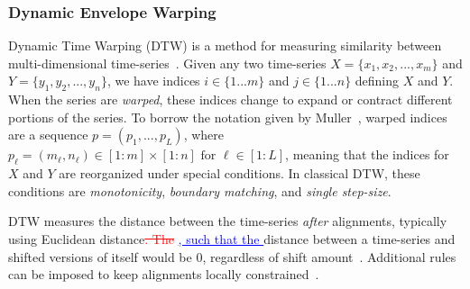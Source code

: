 \documentclass[lettersize,journal]{IEEEtran}
\makeatletter
\renewcommand{\DIFadd}[1]{\textcolor{blue}{\uline{#1}}}
\renewcommand{\DIFdel}[1]{\textcolor{red}{\sout{#1}}}
\providecommand{\DIFadd}[1]{{\protect\color{blue}\uwave{#1}}} %
\providecommand{\DIFdel}[1]{{\protect\color{red}\sout{#1}}} %
\providecommand{\DIFaddbegin}{} %
\providecommand{\DIFaddend}{} %
\providecommand{\DIFdelbegin}{} %
\providecommand{\DIFdelend}{} %
\providecommand{\DIFscaledelfig}{0.5}
\newlength{\DIFdelgraphicswidth} %
\newlength{\DIFdelgraphicsheight} %
\providecommand{\DIFaddincludegraphics}[2][]{{\color{blue}\fbox{\DIFOincludegraphics[#1]{#2}}}} %
\providecommand{\DIFdelincludegraphics}[2][]{%
\sbox{\DIFdelgraphicsbox}{\DIFOincludegraphics[#1]{#2}}%
\settoboxwidth{\DIFdelgraphicswidth}{\DIFdelgraphicsbox} %
\settoboxtotalheight{\DIFdelgraphicsheight}{\DIFdelgraphicsbox} %
\scalebox{\DIFscaledelfig}{%
\parbox[b]{\DIFdelgraphicswidth}{\usebox{\DIFdelgraphicsbox}\\[-\baselineskip] \rule{\DIFdelgraphicswidth}{0em}}\llap{\resizebox{\DIFdelgraphicswidth}{\DIFdelgraphicsheight}{%
\setlength{\unitlength}{\DIFdelgraphicswidth}%
\begin{picture}(1,1)%
\thicklines\linethickness{2pt} %
{\color[rgb]{1,0,0}\put(0,0){\framebox(1,1){}}}%
{\color[rgb]{1,0,0}\put(0,0){\line( 1,1){1}}}%
{\color[rgb]{1,0,0}\put(0,1){\line(1,-1){1}}}%
\end{picture}%
}\hspace*{3pt}}} %
} %
\DeclareRobustCommand{\DIFaddbegin}{\DIFOaddbegin \let\includegraphics\DIFaddincludegraphics} %
\DeclareRobustCommand{\DIFaddend}{\DIFOaddend \let\includegraphics\DIFOincludegraphics} %
\DeclareRobustCommand{\DIFdelbegin}{\DIFOdelbegin \let\includegraphics\DIFdelincludegraphics} %
\DeclareRobustCommand{\DIFdelend}{\DIFOaddend \let\includegraphics\DIFOincludegraphics} %
\let\sout@orig\sout %
\renewcommand{\sout}[1]{\ifmmode\text{\sout@orig{\ensuremath{#1}}}\else\sout@orig{#1}\fi} %
\makeatother
\begin{document}
\subsubsection{Dynamic Envelope Warping}
Dynamic Time Warping (DTW) is a method for measuring similarity between multi-dimensional time-series~\cite{rabiner1993fundamentals,muller2007dynamic,giorgino2009computing}. Given any two time-series $X = \{x_1,x_2,...,x_m\}$ and $Y = \{y_1,y_2,...,y_n\}$, we have indices $i\in\{1...m\}$ and $j\in\{1...n\}$ defining $X$ and $Y$. When the series are \textit{warped}, these indices change to expand or contract different portions of the series. To borrow the notation given by Muller~\cite{muller2007dynamic}, warped indices are a sequence $p=(p_1,...,p_L)$, where \(p_\ell = (m_\ell, n_\ell) \in [1 : m] \times [1 : n] \text{ for } \ell \in [1 : L]\), meaning that the indices for $X$ and $Y$ are reorganized under special conditions. In classical DTW, these conditions are \textit{monotonicity}, \textit{boundary matching}, and \textit{single step-size}. \DIFdelbegin %

\DIFdelend DTW measures the distance between the time-series \textit{after} alignments, typically using Euclidean distance\DIFdelbegin \DIFdel{. The }\DIFdelend \DIFaddbegin \DIFadd{, such that the }\DIFaddend distance between a time-series and shifted versions of itself would be 0, regardless of shift amount~\cite{tavenard.blog.dtw}. Additional rules can be imposed to keep alignments locally constrained~\cite{itakura1975minimum,sakoe1978dynamic}.
\end{document}
